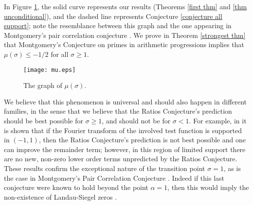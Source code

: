 \documentclass[12pt,reqno]{amsart}
\numberwithin{equation}{section}
\theoremstyle{plain}
\begin{document}
In Figure \ref{figure mu(sigma)}, the solid curve represents our results (Theorems \ref{first thm} and \ref{thm unconditional}), and the dashed line represents Conjecture \ref{conjecture all support}; note the resemblance between this graph and the one appearing in Montgomery's pair correlation conjecture \cite{Mon2}. We prove in Theorem \ref{strongest thm} that Montgomery's Conjecture on primes in arithmetic progressions implies that $\mu(\sigma)\leq -1/2$ for all $\sigma \geq 1$.

\begin{figure}
\begin{center}
\texttt{[image: mu.eps]}
\caption{\label{figure mu(sigma)} The graph of $\mu(\sigma)$.}
\end{center}
\end{figure}

We believe that this phenomenon is universal and should also happen in different families, in the sense that we believe that the Ratios Conjecture's prediction should be best possible for $\sigma \geq 1$, and should not be for $\sigma<1$. For example, in \cite{Mil4} it is shown that if the Fourier transform of the involved test function is supported in $(-1,1)$, then the Ratios Conjecture's prediction is not best possible and one can improve the remainder term; however, in this region of limited support there are no new, non-zero lower order terms unpredicted by the Ratios Conjecture.
These results confirm the exceptional nature of the transition point $\sigma =1$, as is the case in Montgomery's Pair Correlation Conjecture \cite{Mon2}. Indeed if this last conjecture were known to hold beyond the point $\alpha =1$, then this would imply the non-existence of Landau-Siegel zeros \cite{CI}.
\end{document}
